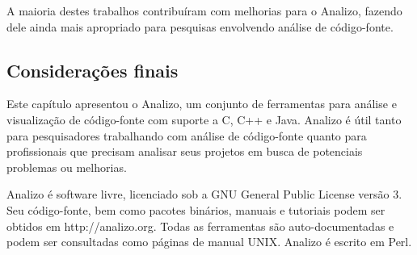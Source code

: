 A maioria destes trabalhos contribuíram com melhorias para o Analizo, fazendo
dele ainda mais apropriado para pesquisas envolvendo análise de código-fonte.

\subsection{Considerações finais}

Este capítulo apresentou o Analizo, um conjunto de ferramentas para análise e
visualização de código-fonte com suporte a C, C++ e Java. Analizo é útil tanto
para pesquisadores trabalhando com análise de código-fonte quanto para
profissionais que precisam analisar seus projetos em busca de
potenciais problemas ou melhorias.

Analizo é software livre, licenciado sob a GNU General Public License versão 3.
Seu código-fonte, bem como pacotes binários, manuais e tutoriais podem ser
obtidos em http://analizo.org. Todas as ferramentas são auto-documentadas e
podem ser consultadas como páginas de manual UNIX. Analizo é escrito em Perl.
